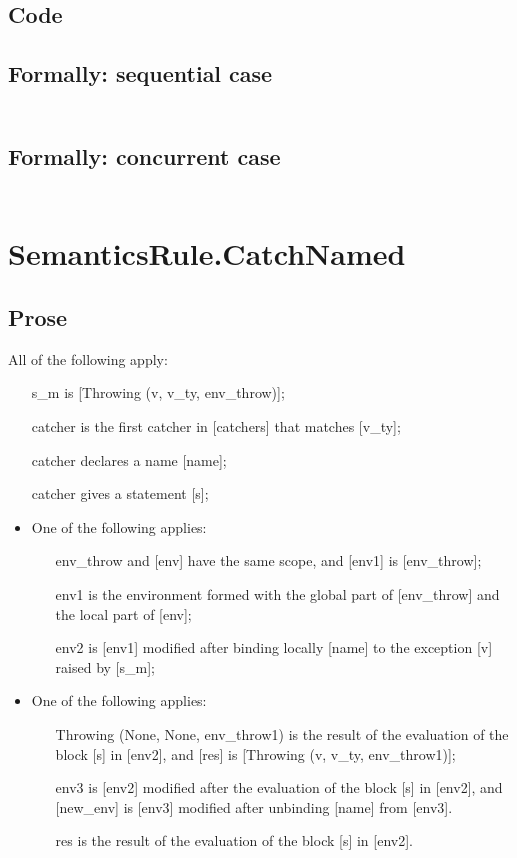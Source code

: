\documentclass{book}
\begin{document}
  \subsection{Code}

  \subsection{Formally: sequential case}
  \begin{align}
  \end{align} 

  \subsection{Formally: concurrent case}
  \begin{align}
  \end{align} 

\section{SemanticsRule.CatchNamed \label{sec:SemanticsRule.CatchNamed}}

    \subsection{Prose}
    All of the following apply:
    \begin{itemize}
    \item [s\_m] is [Throwing (v, v\_ty, env\_throw)];
    \item [catcher] is the first catcher in [catchers] that matches [v\_ty];
    \item [catcher] declares a name [name];
    \item [catcher] gives a statement [s];
    \item One of the following applies:
      \begin{itemize}
      \item [env\_throw] and [env] have the same scope, and [env1] is [env\_throw];
      \item [env1] is the environment formed with the global part of [env\_throw]
        and the local part of [env];
      \item [env2] is [env1] modified after binding locally [name] to the exception
        [v] raised by [s\_m];
      \end{itemize}
    \item One of the following applies:
      \begin{itemize}
      \item [Throwing (None, None, env\_throw1)] is the result of the evaluation of
        the block [s] in [env2], and [res] is [Throwing (v, v\_ty, env\_throw1)];
      \item [env3] is [env2] modified after the evaluation of the block [s] in
        [env2], and [new\_env] is [env3] modified after unbinding [name] from
        [env3].
      \item [res] is the result of the evaluation of the block [s] in [env2].
      \end{itemize}
    \end{itemize}
\end{document}
